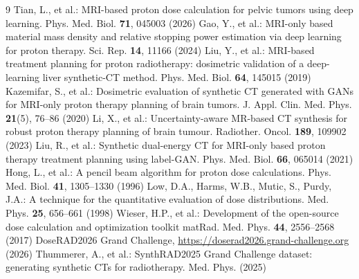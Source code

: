 \documentclass{llncs}
\begin{document}
\clearpage
\begin{thebibliography}{9}\small
{} Tian, L., et al.: MRI-based proton dose calculation for pelvic tumors using
deep learning. Phys. Med. Biol. \textbf{71}, 045003 (2026)
 Gao, Y., et al.: MRI-only based material mass density and relative stopping power
estimation via deep learning for proton therapy. Sci. Rep. \textbf{14}, 11166 (2024)
 Liu, Y., et al.: MRI-based treatment planning for proton radiotherapy: dosimetric
validation of a deep-learning liver synthetic-CT method. Phys. Med. Biol. \textbf{64}, 145015 (2019)
 Kazemifar, S., et al.: Dosimetric evaluation of synthetic CT generated with
GANs for MRI-only proton therapy planning of brain tumors. J. Appl. Clin. Med. Phys.
\textbf{21}(5), 76--86 (2020)
 Li, X., et al.: Uncertainty-aware MR-based CT synthesis for robust proton therapy
planning of brain tumour. Radiother. Oncol. \textbf{189}, 109902 (2023)
 Liu, R., et al.: Synthetic dual-energy CT for MRI-only based proton therapy
treatment planning using label-GAN. Phys. Med. Biol. \textbf{66}, 065014 (2021)
 Hong, L., et al.: A pencil beam algorithm for proton dose calculations. Phys. Med.
Biol. \textbf{41}, 1305--1330 (1996)
 Low, D.A., Harms, W.B., Mutic, S., Purdy, J.A.: A technique for the quantitative
evaluation of dose distributions. Med. Phys. \textbf{25}, 656--661 (1998)
 Wieser, H.P., et al.: Development of the open-source dose calculation and
optimization toolkit matRad. Med. Phys. \textbf{44}, 2556--2568 (2017)
 DoseRAD2026 Grand Challenge, \url{https://doserad2026.grand-challenge.org} (2026)
 Thummerer, A., et al.: SynthRAD2025 Grand Challenge dataset: generating
synthetic CTs for radiotherapy. Med. Phys. (2025)
\end{thebibliography}
\end{document}
